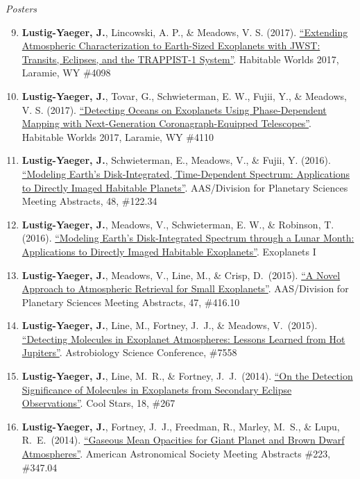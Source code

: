\documentclass[margin,10pt]{res}
\newenvironment{benumerate}[1]{
    \let\oldItem\item
    \def\item{\addtocounter{enumi}{-2}\oldItem}
    \begin{enumerate}
    \setcounter{enumi}{#1}
    \addtocounter{enumi}{1}
}{
    \end{enumerate}
}
\begin{document}
\begin{resume}
                {\sl Posters}
                \begin{benumerate}{8}  
                    \item \textbf{Lustig-Yaeger, J.}, Lincowski, A. P., \& Meadows, V. S. (2017). \href{https://www.hou.usra.edu/meetings/habitableworlds2017/pdf/4098.pdf}{``Extending Atmospheric Characterization to Earth-Sized Exoplanets with JWST: Transits, Eclipses, and the TRAPPIST-1 System''}. Habitable Worlds 2017, Laramie, WY \#4098
                    \item \textbf{Lustig-Yaeger, J.}, Tovar, G., Schwieterman, E. W., Fujii, Y., \& Meadows, V. S. (2017). \href{https://www.hou.usra.edu/meetings/habitableworlds2017/pdf/4110.pdf}{``Detecting Oceans on Exoplanets Using Phase-Dependent Mapping with Next-Generation Coronagraph-Equipped Telescopes''}. Habitable Worlds 2017, Laramie, WY \#4110
                    \item \textbf{Lustig-Yaeger, J.}, Schwieterman, E., Meadows, V., \& Fujii, Y. (2016). \href{http://adsabs.harvard.edu/abs/2016DPS....4812234L}{``Modeling Earth's Disk-Integrated, Time-Dependent Spectrum: Applications to Directly Imaged Habitable Planets''}. AAS/Division for Planetary Sciences Meeting Abstracts, 48, \#122.34
                    \item \textbf{Lustig-Yaeger, J.}, Meadows, V., Schwieterman, E. W., \& Robinson, T. (2016). \href{http://www.exoplanetscience.org/speakers}{``Modeling Earth’s Disk-Integrated Spectrum through a Lunar Month: 
                    Applications to Directly Imaged Habitable Exoplanets''}. Exoplanets I
                    \item \textbf{Lustig-Yaeger, J.}, Meadows, V., Line, M., \& Crisp, D.\ (2015). \href{http://adsabs.harvard.edu/abs/2015DPS....4741610L}{``A Novel Approach to Atmospheric Retrieval for Small Exoplanets''}. AAS/Division for Planetary Sciences Meeting Abstracts, 47, \#416.10
                    \item \textbf{Lustig-Yaeger, J.}, Line, M., Fortney, J.~J., \& Meadows, V.\ (2015). \href{http://www.hou.usra.edu/meetings/abscicon2015/pdf/7558.pdf}{``Detecting Molecules in Exoplanet Atmospheres: Lessons Learned from Hot Jupiters''}. Astrobiology Science Conference, \#7558
                    \item \textbf{Lustig-Yaeger, J.},  Line, M.~R., \& Fortney, J.~J.\ (2014). \href{http://www2.lowell.edu/workshops/coolstars18/abstracts-posters/poster-abstract-267.html}{``On the Detection Significance of Molecules in Exoplanets from Secondary Eclipse Observations''}. Cool Stars, 18, \#267
                    \item \textbf{Lustig-Yaeger, J.}, Fortney, J.~J., Freedman, R., Marley, M.~S., \& Lupu, R.~E.\ (2014). \href{http://adsabs.harvard.edu/abs/2014AAS...22334704L}{``Gaseous Mean Opacities for Giant Planet and Brown Dwarf Atmospheres''}. American Astronomical Society Meeting Abstracts \#223, \#347.04\\
                 \end{benumerate}
                 

\end{resume}
\end{document}
